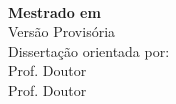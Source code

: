 \begin{center}
\vspace{1.5cm}
\vfill
\Large{ \selectfont \Autor}\\
\vspace{1.8 cm}
\vfill
\large{\bf{\selectfont Mestrado em \MDesignacao }}\\
\vspace{0.8cm}
\vfill
\normalsize{\selectfont Versão Provisória}\\
\vspace{0.8cm}
\vfill
\large{\selectfont Dissertação orientada por:}\\%
\large{\selectfont Prof. Doutor \Orientador} \\
\large{\selectfont Prof. Doutor \PCoOrientador} \\
\vspace{1.5 cm}
\vfill

\vfill
\end{center}
\setcounter{page}{1}
\newpage
\mbox{}
\newpage


